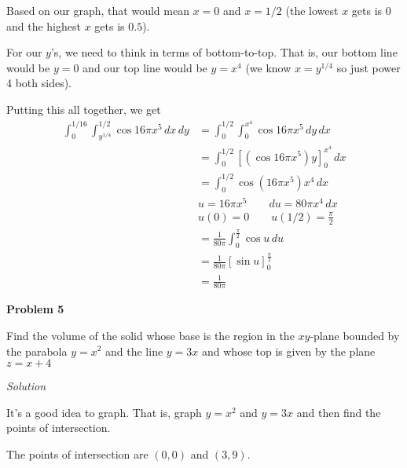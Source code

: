 \documentclass{article}
\newcommand{\lrp}[1]{\left( #1 \right)}
\newcommand{\lrb}[1]{\left[ #1 \right]}
\newcommand{\Solution}{\textit{Solution}}
\begin{document}
Based on our graph, that would mean $x=0$ and $x=1/2$ (the lowest $x$ gets is $0$ and the highest $x$ gets is $0.5$).

For our $y$'s, we need to think in terms of bottom-to-top. That is, our bottom line would be $y=0$ and our top line would be $y=x^4$ (we know $x=y^{1/4}$ so just power 4 both sides).

Putting this all together, we get
\begin{align*}
    \int_0^{1/16}\int_{y^{1/4}}^{1/2}\cos 16\pi x^5\,dx\,dy&=\int_0^{1/2}\int_0^{x^4} \cos 16\pi x^5 \,dy\,dx\\
    &=\int_0^{1/2}\lrb{\lrp{\cos 16\pi x^5}y}_0^{x^4}\,dx\\
    &=\int_0^{1/2}\cos(16\pi x^5)x^4\,dx\\
    &u=16\pi x^5\hspace{2em}du=80\pi x^4\,dx\\
    &u(0)=0\hspace{2em}u(1/2)=\frac{\pi}{2}\\
    &=\frac{1}{80\pi}\int_0^{\frac{\pi}{2}}\cos u\,du\\
    &=\frac{1}{80\pi}\lrb{\sin u}_0^{\frac{\pi}{2}}\\
    &=\boxed{\frac{1}{80\pi}}
\end{align*}

\textbf{Problem 5}

Find the volume of the solid whose base is the region in the $xy$-plane bounded by the parabola $y=x^2$ and the line $y=3x$ and whose top is given by the plane $z=x+4$

\Solution

It's a good idea to graph. That is, graph $y=x^2$ and $y=3x$ and then find the points of intersection.

\begin{center}
\end{center}
The points of intersection are $(0,0)$ and $(3,9)$.
\end{document}
